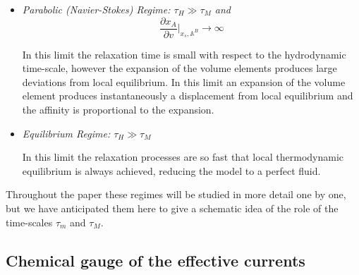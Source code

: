 \documentclass[useAMS,usenatbib,prd,twocolumn,nofootinbib]{revtex4-1}
\begin{document}
\begin{itemize}
\item \textit{Parabolic (Navier-Stokes) Regime: $\tau_H \gg \tau_M$ and }
\begin{equation}
\dfrac{\partial x_A}{\partial v}\bigg|_{x_s,\mathbb{A}^B} \longrightarrow \infty
\end{equation}


In this limit the relaxation time is small with respect to the hydrodynamic time-scale, however the expansion of the volume elements produces large deviations from local equilibrium. In this limit an expansion of the volume element produces instantaneously a displacement from local equilibrium and the affinity is proportional to the expansion.

 

\item \textit{Equilibrium Regime: $\tau_H \gg \tau_M$}


In this limit the relaxation processes are so fast that local thermodynamic equilibrium is always achieved, reducing the model to a perfect fluid.

\end{itemize}


Throughout the paper these regimes will be studied in more detail one by one, but we have anticipated them here to give a schematic idea of the role of the time-scales $\tau_m$ and $\tau_M$.




\subsection{Chemical gauge of the effective currents}\label{gauge}
\end{document}
